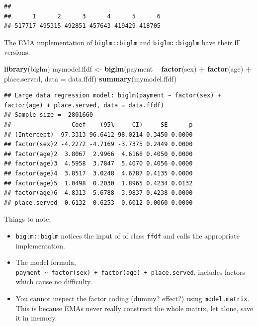 \documentclass[]{book}
\newenvironment{Shaded}{\begin{snugshade}}{\end{snugshade}}
\newcommand{\DataTypeTok}[1]{\textcolor[rgb]{0.13,0.29,0.53}{#1}}
\newcommand{\KeywordTok}[1]{\textcolor[rgb]{0.13,0.29,0.53}{\textbf{#1}}}
\newcommand{\NormalTok}[1]{#1}
\newcommand{\OperatorTok}[1]{\textcolor[rgb]{0.81,0.36,0.00}{\textbf{#1}}}
\newcommand{\StringTok}[1]{\textcolor[rgb]{0.31,0.60,0.02}{#1}}
\providecommand{\tightlist}{%
  \setlength{\itemsep}{0pt}\setlength{\parskip}{0pt}}
\theoremstyle{definition}
\theoremstyle{definition}
\theoremstyle{definition}
\theoremstyle{remark}
\begin{document}
\begin{verbatim}
## 
##      1      2      3      4      5      6 
## 517717 495315 492851 457643 419429 418705
\end{verbatim}

The EMA implementation of \texttt{biglm::biglm} and \texttt{biglm::bigglm} have their \textbf{ff} versions.

\begin{Shaded}
\begin{Highlighting}[]
\KeywordTok{library}\NormalTok{(biglm)}
\NormalTok{mymodel.ffdf <-}\StringTok{ }\KeywordTok{biglm}\NormalTok{(payment }\OperatorTok{~}\StringTok{ }\KeywordTok{factor}\NormalTok{(sex) }\OperatorTok{+}\StringTok{ }\KeywordTok{factor}\NormalTok{(age) }\OperatorTok{+}\StringTok{ }\NormalTok{place.served, }
                              \DataTypeTok{data =}\NormalTok{ data.ffdf)}
\KeywordTok{summary}\NormalTok{(mymodel.ffdf)}
\end{Highlighting}
\end{Shaded}

\begin{verbatim}
## Large data regression model: biglm(payment ~ factor(sex) + factor(age) + place.served, data = data.ffdf)
## Sample size =  2801660 
##                 Coef    (95%     CI)     SE      p
## (Intercept)  97.3313 96.6412 98.0214 0.3450 0.0000
## factor(sex)2 -4.2272 -4.7169 -3.7375 0.2449 0.0000
## factor(age)2  3.8067  2.9966  4.6168 0.4050 0.0000
## factor(age)3  4.5958  3.7847  5.4070 0.4056 0.0000
## factor(age)4  3.8517  3.0248  4.6787 0.4135 0.0000
## factor(age)5  1.0498  0.2030  1.8965 0.4234 0.0132
## factor(age)6 -4.8313 -5.6788 -3.9837 0.4238 0.0000
## place.served -0.6132 -0.6253 -0.6012 0.0060 0.0000
\end{verbatim}

Things to note:

\begin{itemize}
\tightlist
\item
  \texttt{biglm::biglm} notices the input of of class \texttt{ffdf} and calls the appropriate implementation.
\item
  The model formula, \texttt{payment\ \textasciitilde{}\ factor(sex)\ +\ factor(age)\ +\ place.served}, includes factors which cause no difficulty.
\item
  You cannot inspect the factor coding (dummy? effect?) using \texttt{model.matrix}.
  This is because EMAs never really construct the whole matrix, let alone, save it in memory.
\end{itemize}
\end{document}
